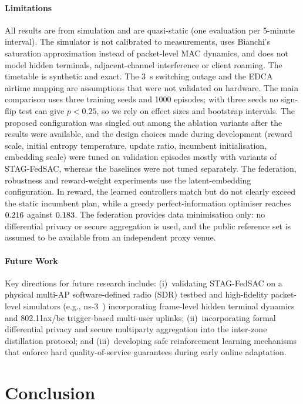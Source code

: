 \paragraph{Limitations} 
All results are from simulation and are quasi-static (one evaluation per 5-minute interval). The simulator is not calibrated to measurements, uses Bianchi's saturation approximation instead of packet-level MAC dynamics, and does not model hidden terminals, adjacent-channel interference or client roaming. The timetable is synthetic and exact. The $3$~s switching outage and the EDCA airtime mapping are assumptions that were not validated on hardware. The main comparison uses three training seeds and 1000 episodes; with three seeds no sign-flip test can give $p<0.25$, so we rely on effect sizes and bootstrap intervals. The proposed configuration was singled out among the ablation variants after the results were available, and the design choices made during development (reward scale, initial entropy temperature, update ratio, incumbent initialisation, embedding scale) were tuned on validation episodes mostly with variants of STAG-FedSAC, whereas the baselines were not tuned separately. The federation, robustness and reward-weight experiments use the latent-embedding configuration. In reward, the learned controllers match but do not clearly exceed the static incumbent plan, while a greedy perfect-information optimiser reaches $0.216$ against $0.183$. The federation provides data minimisation only: no differential privacy or secure aggregation is used, and the public reference set is assumed to be available from an independent proxy venue.

\paragraph{Future Work} 
Key directions for future research include: (i)~validating STAG-FedSAC on a physical multi-AP software-defined radio (SDR) testbed and high-fidelity packet-level simulators (e.g., ns-3~\cite{ns3ai}) incorporating frame-level hidden terminal dynamics and 802.11ax/be trigger-based multi-user uplinks; (ii)~incorporating formal differential privacy and secure multiparty aggregation into the inter-zone distillation protocol; and (iii)~developing safe reinforcement learning mechanisms that enforce hard quality-of-service guarantees during early online adaptation.

\section{Conclusion}
\label{sec:conclusion}

